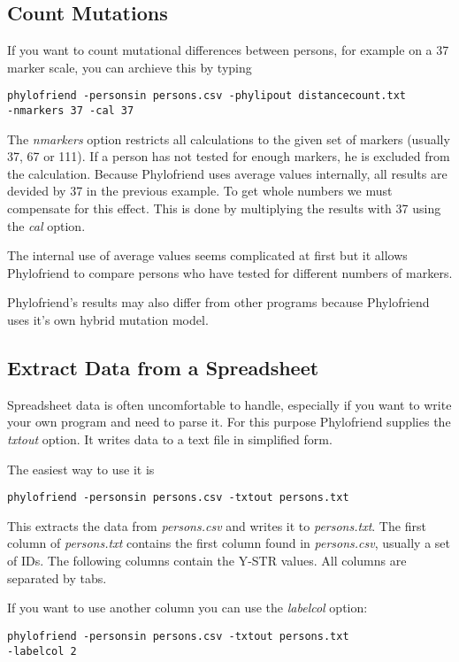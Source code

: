 \subsection{Count Mutations}

If you want to count mutational differences between
persons, for example on a 37 marker scale, you can
archieve this by typing

\noindent\texttt{phylofriend -personsin persons.csv -phylipout distancecount.txt\\
-nmarkers 37 -cal 37}

The \emph{nmarkers} option restricts all calculations
to the given set of markers (usually 37, 67 or 111). If
a person has not tested for enough markers, he is excluded
from the calculation. Because Phylofriend uses average
values internally, all results are devided by 37 in 
the previous example. To get whole numbers we must compensate
for this effect. This is done by multiplying the results
with 37 using the \emph{cal} option.

The internal use of average values seems complicated at
first but it allows Phylofriend to compare persons who
have tested for different numbers of markers.

Phylofriend's results may also differ from other programs
because Phylo\-friend uses it's own hybrid mutation model.


\subsection{Extract Data from a Spreadsheet}

Spreadsheet data is often uncomfortable to handle, especially
if you want to write your own program and need to parse it.
For this purpose Phylofriend supplies the \emph{txtout}
option. It writes data to a text file in simplified form.

The easiest way to use it is

\noindent\texttt{phylofriend -personsin persons.csv -txtout persons.txt}

This extracts the data from \emph{persons.csv} and writes
it to \emph{persons.txt}. The first column of \emph{persons.txt}
contains the first column found in \emph{persons.csv}, usually
a set of IDs. The following columns contain the Y-STR values.
All columns are separated by tabs.

If you want to use another column you can use the
\emph{labelcol} option:

\noindent\texttt{phylofriend -personsin persons.csv -txtout persons.txt\\
-labelcol 2}

